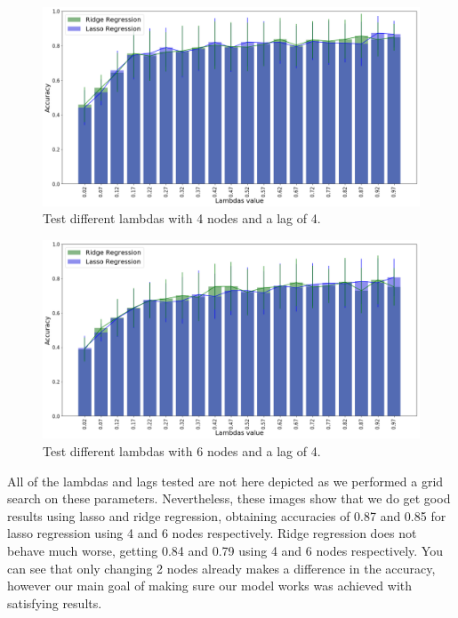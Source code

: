 \documentclass[10pt,conference,compsocconf]{IEEEtran}
\begin{document}
\begin{figure}[tbp]
  \centering
  \includegraphics[width=\columnwidth]{images/comaprisonN4_L4.png}
  \vspace{-5mm}
  \caption{Test different lambdas with 4 nodes and a lag of 4.}
  \vspace{-5mm}
  \label{fig:fig:N4L4}
\end{figure}

\begin{figure}[tbp]
  \centering
  \includegraphics[width=\columnwidth]{images/comaprisonN6_L4.png}
  \vspace{-5mm}
  \caption{Test different lambdas with 6 nodes and a lag of 4.}
  \vspace{-5mm}
  \label{fig:fig:N4L4}
\end{figure}

All of the lambdas and lags tested are not here depicted as we performed a grid search on these parameters. Nevertheless, these images show that we do get good results using lasso and ridge regression, obtaining accuracies of 0.87 and 0.85 for lasso regression using 4 and 6 nodes respectively. Ridge regression does not behave much worse, getting 0.84 and 0.79 using 4 and 6 nodes respectively. You can see that only changing 2 nodes already makes a difference in the accuracy, however our main goal of making sure our model works was achieved with satisfying results. 
\end{document}
